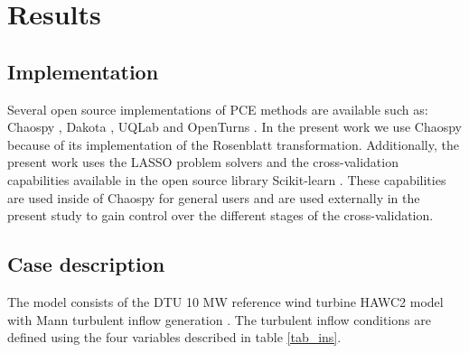\documentclass[preprint,12pt]{elsarticle}
\begin{document}


\section{Results}
\label{sec_Results}

\subsection{Implementation}

Several open source implementations of PCE methods are available such as: Chaospy \cite{feinberg2015chaospy}, Dakota \cite{eldred2007dakota}, UQLab \cite{marelli2014uqlab} and OpenTurns \cite{andrianov2007open}. In the present work we use Chaospy because of its implementation of the Rosenblatt transformation. Additionally, the present work uses the  LASSO problem solvers \cite{tibshirani1996regression} and the cross-validation capabilities available in the open source library Scikit-learn \cite{pedregosa2011scikit}. These capabilities are used inside of Chaospy for general users and are used externally in the present study to gain control over the different stages of the cross-validation.

\subsection{Case description}

The model consists of the DTU 10 MW reference wind turbine HAWC2 model \cite{larsen20072, bak2012light} with Mann turbulent inflow generation \cite{Mann1998}. The turbulent inflow conditions are defined using the four variables described in table \ref{tab_ins}.
\end{document}
